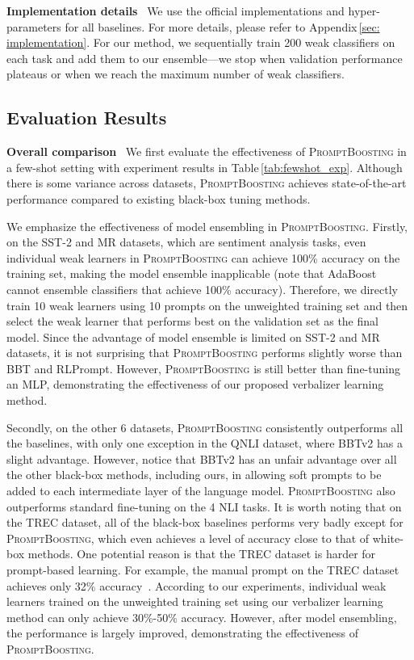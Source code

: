 \documentclass{article}
\theoremstyle{plain}
\theoremstyle{definition}
\theoremstyle{remark}
\newcommand{\alg}{\textsc{PromptBoosting}}
\begin{document}
\noindent \textbf{Implementation details} \ 
We use the official implementations and hyper-parameters for all baselines.
For more details, please refer to Appendix\,\ref{sec: implementation}. For our method, we sequentially train 200 weak classifiers on each task and add them to our ensemble---we stop when validation performance plateaus or when we reach the maximum number of weak classifiers.

\subsection{Evaluation Results}
\label{subsec: eval_result}
\noindent \textbf{Overall comparison} \ 
We first evaluate the effectiveness of {\alg} in a few-shot setting with experiment results in Table\,\ref{tab:fewshot_exp}.
Although there is some variance across datasets, {\alg} achieves state-of-the-art performance compared to existing black-box tuning methods.

We emphasize the effectiveness of model ensembling in {\alg}. Firstly, on the SST-2 and MR datasets, which are sentiment analysis tasks, even individual weak learners in {\alg} can achieve 100\% accuracy on the training set, making the model ensemble inapplicable (note that AdaBoost cannot ensemble classifiers that achieve 100\% accuracy). Therefore, we directly train 10 weak learners using 10 prompts on the unweighted training set and then select the weak learner that performs best on the validation set as the final model. Since the advantage of model ensemble is limited on SST-2 and MR datasets, it is not surprising that {\alg} performs slightly worse than BBT and RLPrompt. However, {\alg} is still better than fine-tuning an MLP, demonstrating the effectiveness of our proposed verbalizer learning method. 

Secondly, on the other 6 datasets, {\alg} consistently outperforms all the baselines, with only one exception in the QNLI dataset, where BBTv2 has a slight advantage. However, notice that BBTv2 has an unfair advantage over all the other black-box methods, including ours, in allowing soft prompts to be added to each intermediate layer of the language model.
{\alg} also outperforms standard fine-tuning on the 4 NLI tasks. It is worth noting that on the TREC dataset, all of the black-box baselines performs very badly except for {\alg}, which even achieves a level of accuracy close to that of white-box methods. One potential reason is that the TREC dataset is harder for prompt-based learning. For example, the manual prompt on the TREC dataset achieves only 32\% accuracy~\cite{gao2021making}. According to our experiments, individual weak learners trained on the unweighted training set using our verbalizer learning method can only achieve 30\%-50\% accuracy. However, after model ensembling, the performance is largely improved, demonstrating the effectiveness of {\alg}.
\end{document}
